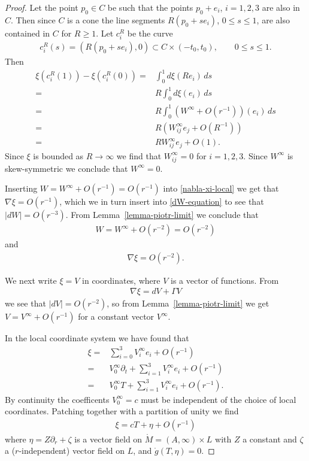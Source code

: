 \documentclass[a4paper,10pt,reqno]{amsart}
\theoremstyle{plain}
\newcommand{\Mring}{\mathring{M}}
\newcommand{\gring}{\mathring{g}}
\numberwithin{equation}{section}
\begin{document}
\begin{proof}
Let the point $p_0 \in C$ be such that the points $p_0 + e_i$, $i=1,2,3$ are also in $C$. Then since $C$ is a cone the line segments $R(p_0 + s e_i)$, $0 \leq s \leq 1$, are also contained in $C$ for $R \geq 1$. Let $c_i^R$ be the curve 
\begin{align}
c_i^R(s) = (R(p_0 + s e_i),0 ) \subset C \times (-t_0,t_0), \qquad 0\leq s \leq 1.
\end{align} 
Then 
\begin{align} 
\xi(c_i^R(1)) - \xi(c_i^R(0)) 
={}& \int_0^1 d\xi(R e_i) \, ds \nonumber\\
={}& R\int_0^1 d\xi(e_i) \, ds \nonumber \\
={}& R\int_0^1 \left( W^\infty + O(r^{-1}) \right)(e_i) \, ds \nonumber \\
={}& R (W^\infty_{ij} e_j + O(R^{-1})) \nonumber \\
={}& R W^\infty_{ij} e_j + O(1).
\end{align} 
Since $\xi$ is bounded as $R \to \infty$ we find that $W^\infty_{ij} = 0$ for $i=1,2,3$. Since $W^\infty$ is skew-symmetric we conclude that $W^\infty = 0$. 

Inserting $W = W^\infty + O(r^{-1}) = O(r^{-1})$ into \eqref{nabla-xi-local} we get that $\nabla \xi = O(r^{-1})$, which we in turn insert into \eqref{dW-equation} to see that $|dW| = O(r^{-3})$. From Lemma~\ref{lemma-piotr-limit} we conclude that 
\begin{align}
W = W^\infty + O(r^{-2}) = O(r^{-2})
\end{align}
and 
\begin{align}
\nabla \xi = O(r^{-2}).
\end{align} 

We next write $\xi = V$ in coordinates, where $V$ is a vector of functions. From 
\begin{align} 
\nabla \xi = dV + \Gamma V  
\end{align} 
we see that $|dV| = O(r^{-2})$, so from Lemma~\ref{lemma-piotr-limit} we get $V = V^\infty + O(r^{-1})$ for a constant vector $V^\infty$. 

In the local coordinate system we have found that
\begin{align}\label{eq:nablaxiO} 
\xi ={}&  \sum_{i=0}^3 V^\infty_i e_i + O(r^{-1}) \nonumber \\
={}&  V^\infty_0 \partial_t + \sum_{i=1}^3 V^\infty_i e_i + O(r^{-1}) \nonumber \\
={}&  V^\infty_0 T + \sum_{i=1}^3 V^\infty_i e_i + O(r^{-1}).
\end{align} 
By continuity the coefficents $V^\infty_0 = c$ must be independent of the choice of local coordinates. Patching together with a partition of unity we find
\begin{align} 
\xi = cT + \eta + O(r^{-1})
\end{align} 
where $\eta = Z \partial_r + \zeta$ is a vector field on $\Mring = (A,\infty)\times L$ with $Z$ a constant and $\zeta$ a ($r$-independent) vector field on $L$, and $\gring(T,\eta) = 0$. 


\end{proof}
\end{document}
